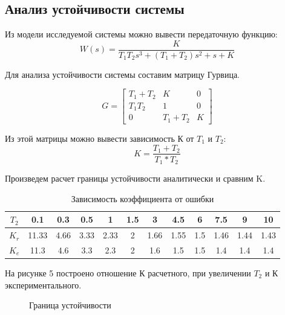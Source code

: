 \documentclass[a4paper, 11pt]{article}
\begin{document}
\newpage
	\begin{center}
		\section{Анализ устойчивости системы}
	\end{center}\hfill\par 
Из модели исследуемой системы можно вывести передаточную функцию:
	\begin{equation}
		W(s) = \frac{K}{T_1 T_2 s^3 + (T_1 + T_2)s^2 + s + K}
	\end{equation}
	
Для анализа устойчивости системы составим матрицу Гурвица.
	
	\begin{equation}
		G = \begin{bmatrix}
		T_1 + T_2 &  K & 0 \\
		T_1 T_2 & 1 & 0 \\
		0 & T_1 + T_2 & K
		\end{bmatrix}
	\end{equation}
	\hfill\par
Из этой матрицы можно вывести зависимость К от $T_1$ и $T_2$:
	\begin{equation}
		K=\frac{T_1+T_2}{T_1*T_2}
	\end{equation}
	
Произведем расчет границы устойчивости аналитически и сравним K.

\begin{table}[h]
	\caption{Зависимость коэффициента от ошибки}
	\begin{tabular}{|c|c|c|c|c|c|c|c|c|c|c|c|}
		\hline
		$T_2$ & 0.1 & 0.3 & 0.5 & 1 & 1.5 & 3 & 4.5 & 6 & 7.5 & 9 & 10\\
		\hline
		$K_r$ & 11.33 & 4.66 &3.33 & 2.33 & 2 & 1.66& 1.55 & 1.5& 1.46& 1.44& 1.43\\
		\hline
		$K_e$ & 11.3 & 4.6 & 3.3 & 2.3 & 2 & 1.6& 1.5 & 1.5 & 1.4& 1.4& 1.4\\
		\hline		    
	\end{tabular}	
	\label{tab:my_label}
\end{table}
	
На рисунке 5 построено отношение К расчетного, при увеличении $T_2$ и К экспериментального.

	\begin{figure}[h!]
		\caption{Граница устойчивости}
		\label{final}
	\end{figure}
\end{document}
